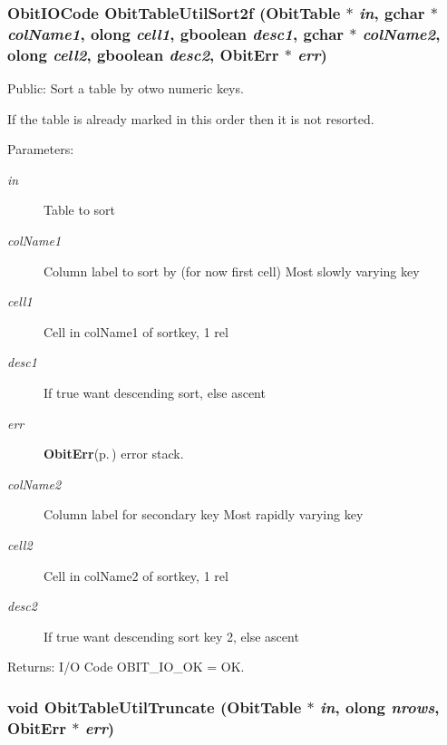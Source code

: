 \subsubsection{\setlength{\rightskip}{0pt plus 5cm}Obit\-IOCode Obit\-Table\-Util\-Sort2f ({\bf Obit\-Table} $\ast$ {\em in}, gchar $\ast$ {\em col\-Name1}, {\bf olong} {\em cell1}, gboolean {\em desc1}, gchar $\ast$ {\em col\-Name2}, {\bf olong} {\em cell2}, gboolean {\em desc2}, {\bf Obit\-Err} $\ast$ {\em err})}\label{ObitTableUtil_8c_a15}


Public: Sort a table by otwo numeric keys. 

If the table is already marked in this order then it is not resorted. \begin{Desc}
\item[Parameters:]
\begin{description}
\item[{\em in}]Table to sort \item[{\em col\-Name1}]Column label to sort by (for now first cell) Most slowly varying key \item[{\em cell1}]Cell in col\-Name1 of sortkey, 1 rel \item[{\em desc1}]If true want descending sort, else ascent \item[{\em err}]{\bf Obit\-Err}{\rm (p.\,\pageref{structObitErr})} error stack. \item[{\em col\-Name2}]Column label for secondary key Most rapidly varying key \item[{\em cell2}]Cell in col\-Name2 of sortkey, 1 rel \item[{\em desc2}]If true want descending sort key 2, else ascent \end{description}
\end{Desc}
\begin{Desc}
\item[Returns:]I/O Code OBIT\_\-IO\_\-OK = OK. \end{Desc}
\subsubsection{\setlength{\rightskip}{0pt plus 5cm}void Obit\-Table\-Util\-Truncate ({\bf Obit\-Table} $\ast$ {\em in}, {\bf olong} {\em nrows}, {\bf Obit\-Err} $\ast$ {\em err})}\label{ObitTableUtil_8c_a16}


